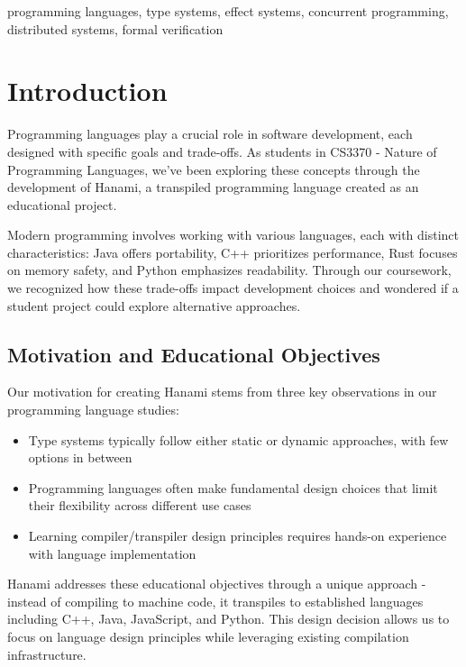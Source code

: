 \documentclass[conference]{IEEEtran}
\begin{document}
\begin{IEEEkeywords}
    programming languages, type systems, effect systems, concurrent programming, distributed systems, formal verification
\end{IEEEkeywords}

\newpage
\tableofcontents
\newpage

\clearpage %
\section{Introduction}
\label{sec:introduction}

Programming languages play a crucial role in software development, each designed with specific goals and trade-offs. As students in CS3370 - Nature of Programming Languages, we've been exploring these concepts through the development of Hanami, a transpiled programming language created as an educational project.

Modern programming involves working with various languages, each with distinct characteristics: Java offers portability, C++ prioritizes performance, Rust focuses on memory safety, and Python emphasizes readability. Through our coursework, we recognized how these trade-offs impact development choices and wondered if a student project could explore alternative approaches.

\subsection{Motivation and Educational Objectives}

Our motivation for creating Hanami stems from three key observations in our programming language studies:

\begin{itemize}
    \item Type systems typically follow either static or dynamic approaches, with few options in between
    \item Programming languages often make fundamental design choices that limit their flexibility across different use cases
    \item Learning compiler/transpiler design principles requires hands-on experience with language implementation
\end{itemize}

Hanami addresses these educational objectives through a unique approach - instead of compiling to machine code, it transpiles to established languages including C++, Java, JavaScript, and Python. This design decision allows us to focus on language design principles while leveraging existing compilation infrastructure.
\end{document}
